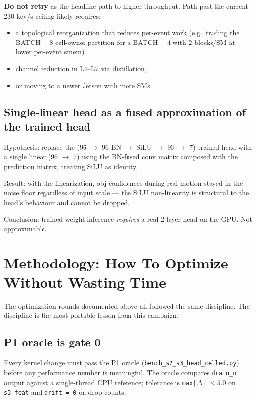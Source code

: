 \documentclass[11pt,a4paper]{article}
\begin{document}
\textbf{Do not retry} as the headline path to higher throughput. Path
past the current 230 kev/s ceiling likely requires:

\begin{itemize}[itemsep=0pt]
  \item a topological reorganization that reduces per-event work
        (e.g.\ trading the BATCH$=$8 cell-owner partition for a
        BATCH$=$4 with 2 blocks/SM at lower per-event smem),
  \item channel reduction in L4--L7 via distillation,
  \item or moving to a newer Jetson with more SMs.
\end{itemize}

\subsection{Single-linear head as a fused approximation of the trained head}

Hypothesis: replace the (96 $\to$ 96 BN $\to$ SiLU $\to$ 96 $\to$ 7)
trained head with a single linear (96 $\to$ 7) using the BN-fused conv
matrix composed with the prediction matrix, treating SiLU as identity.

Result: with the linearization, obj confidences during real motion
stayed in the noise floor regardless of input scale --- the SiLU
non-linearity is structural to the head's behaviour and cannot be
dropped.

Conclusion: trained-weight inference \emph{requires} a real 2-layer
head on the GPU. Not approximable.

\section{Methodology: How To Optimize Without Wasting Time}
\label{sec:methodology}

The optimization rounds documented above all followed the same
discipline. The discipline is the most portable lesson from this
campaign.

\subsection{P1 oracle is gate 0}

Every kernel change must pass the P1 oracle
(\texttt{bench\_s2\_s3\_head\_celled.py}) before any performance number
is meaningful. The oracle compares \texttt{drain\_n} output against a
single-thread CPU reference; tolerance is \texttt{max|}$\Delta$\texttt{|}
$\leq 5.0$ on \texttt{s3\_feat} and \texttt{drift = 0} on drop counts.
\end{document}
